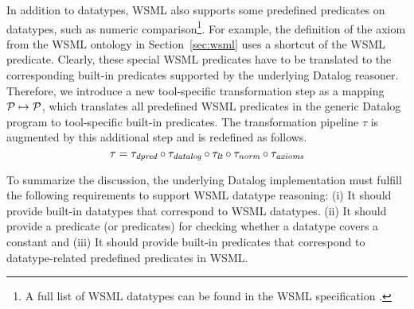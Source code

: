 In addition to datatypes, WSML also supports some predefined
predicates on datatypes, such as numeric comparison\footnote{A
full list of WSML datatypes can be found in the WSML specification
\cite{wsml-spec}.}. For example, the definition of the
 axiom from the WSML
ontology in Section~\ref{sec:wsml} uses a shortcut of the WSML
 predicate. Clearly, these special WSML
predicates have to be translated to the corresponding built-in
predicates supported by the underlying Datalog reasoner.
Therefore, we introduce a new tool-specific transformation step
\transdpred as a mapping $\P \mapsto \P$, which translates all
predefined WSML predicates in the generic Datalog program to
tool-specific built-in predicates. The transformation pipeline
$\tau$ is augmented by this additional step and is redefined as
follows.
\begin{displaymath}
    \tau = \transdpred \circ \transdlog \circ \translt \circ \transnorm \circ \transax
\end{displaymath}

To summarize the discussion, the underlying Datalog implementation
must fulfill the following requirements to support WSML datatype
reasoning: (i) It should provide built-in datatypes that
correspond to WSML datatypes. (ii) It should provide a predicate
(or predicates) for checking whether a datatype covers a constant
and (iii) It should provide built-in predicates that correspond to
datatype-related predefined predicates in WSML.

